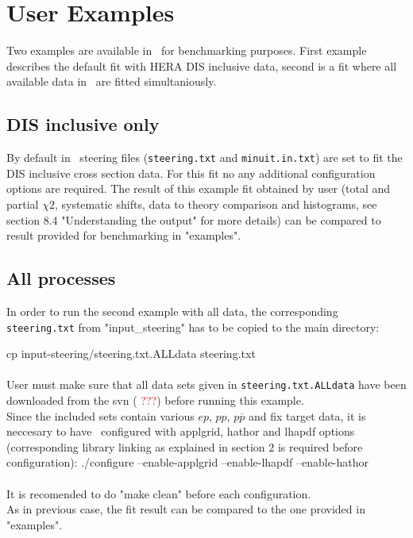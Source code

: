 \section{User Examples}
Two examples are available in \fitter\ for benchmarking purposes.
First example describes the default fit with HERA DIS inclusive data,
second is a fit where all available data in \fitter\ are fitted simultaniously.

\subsection{DIS inclusive only}
By default in \fitter\ steering files ({\tt steering.txt} and {\tt minuit.in.txt})
are set to fit the DIS inclusive cross section data. For this fit no any additional
configuration options are required.
The result of this example fit obtained by user (total and partial $\chi2$, systematic shifts, 
data to theory comparison and histograms, see section 8.4 "Understanding the output" for more details) 
can be compared to result provided for benchmarking in "examples".

\subsection{All processes}
In order to run the second example with all data, the corresponding
{\tt steering.txt} from "input\_steering" has to be copied to the main directory:

\goodbreak                 
cp input-steering/steering.txt.ALLdata steering.txt
\\ \\
User must make sure that all data sets given in {\tt steering.txt.ALLdata} 
have been downloaded from the svn (\textcolor{red}{ ???}) before running this example. 
\\
Since the included sets contain various $ep$, $pp$, $p \overline p$ and fix target
data, it is neccesary to have \fitter\ configured with applgrid, hathor and 
lhapdf options (corresponding library linking as explained in section 2 is
required before configuration): 
\goodbreak
./configure --enable-applgrid --enable-lhapdf --enable-hathor
\\ \\
It is recomended to do "make clean" before each configuration. \\        
As in previous case, the fit result can be compared to the one provided in "examples".



